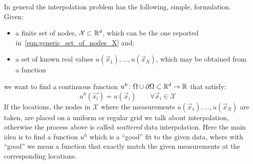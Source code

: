\smallskip
In general the interpolation problem has the following, simple, formulation. Given:
\begin{itemize}
	\item a finite set of nodes,  $\mathcal{X} \subset \mathbb{R}^d$, which can be the one reported in~\eqref{eqn:generic_set_of_nodes_X} and;
	\item a set of known real values $u(\vec{x}_1), \dots, u(\vec{x}_N)$, which may be obtained from a function
\end{itemize}
we want to find a continuous function $u^{h} \colon \Omega\cup\partial\Omega\subset\mathbb{R}^{d} \to \mathbb{R}$ that satisfy:
\begin{equation}
	\label{eqn:interpolation_constraints}
	u^{h}(\vec{x_i}) = u(\vec{x}_i) \qquad  \forall \vec{x}_i \in \mathcal{X}
\end{equation}
If the locations, the nodes in $\mathcal{X}$ where the measurements $u(\vec{x}_1), \dots, u(\vec{x}_N)$ are taken, are placed on a uniform or regular grid we talk about interpolation, otherwise the process above is called \emph{scattered} data interpolation. Here the main idea is to find a function $u^h$ which is a ``good''  fit to the given data, where with ``good'' we mean a function that exactly match the given measurements at the corresponding locations.

